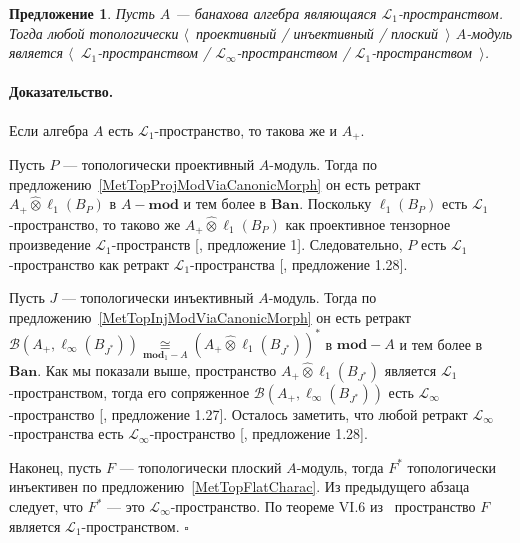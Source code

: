 \documentclass[12pt]{article}
\newcommand{\projtens}{\mathbin{\widehat{\otimes}}}
\newcommand{\isom}[1]{\mathop{\mathbin{\cong}}\limits_{#1}}
\newtheorem{proposition}[theorem]{Предложение}
\renewenvironment{proof}{\paragraph{Доказательство.}}{\hfill$\square$\medskip}
\begin{document}
\begin{proposition}\label{TopProjInjFlatModOverMthscrL1SpCharac} Пусть $A$ ---
    банахова алгебра являющаяся $\mathscr{L}_1$-пространством. Тогда любой
    топологически $\langle$~проективный / инъективный / плоский~$\rangle$
    $A$-модуль является $\langle$~$\mathscr{L}_1$-пространством /
    $\mathscr{L}_\infty$-пространством /
    $\mathscr{L}_1$-пространством~$\rangle$.
\end{proposition}
\begin{proof} Если алгебра $A$ есть $\mathscr{L}_1$-пространство, то такова же и
    $A_+$.

    Пусть $P$ --- топологически проективный $A$-модуль. Тогда по
    предложению~\ref{MetTopProjModViaCanonicMorph} он есть ретракт $A_+\projtens
        \ell_1(B_P)$ в $A-\mathbf{mod}$ и тем более в $\mathbf{Ban}$. Поскольку
    $\ell_1(B_P)$ есть $\mathscr{L}_1$-пространство, то таково же
    $A_+\projtens\ell_1(B_P)$ как проективное тензорное произведение
    $\mathscr{L}_1$-пространств [\cite{GonzDPPInTensProd}, предложение 1].
    Следовательно, $P$ есть $\mathscr{L}_1$-пространство как ретракт
    $\mathscr{L}_1$-пространства [\cite{BourgNewClOfLpSp}, предложение 1.28].

    Пусть $J$ --- топологически инъективный $A$-модуль. Тогда по
    предложению~\ref{MetTopInjModViaCanonicMorph} он есть ретракт
    $\mathcal{B}(A_+,\ell_\infty(B_{J^*})) \isom{\mathbf{mod}_1-A}
        {(A_+\projtens\ell_1(B_{J^*}))}^*$ в $\mathbf{mod}-A$ и тем более в
    $\mathbf{Ban}$. Как мы показали выше, пространство
    $A_+\projtens\ell_1(B_{J^*})$ является $\mathscr{L}_1$-пространством, тогда
    его сопряженное $\mathcal{B}(A_+,\ell_\infty(B_{J^*}))$ есть
    $\mathscr{L}_\infty$-пространство [\cite{BourgNewClOfLpSp}, предложение
    1.27]. Осталось заметить, что любой ретракт
    $\mathscr{L}_\infty$-пространства есть $\mathscr{L}_\infty$-пространство
    [\cite{BourgNewClOfLpSp}, предложение 1.28].

    Наконец, пусть $F$ --- топологически плоский $A$-модуль, тогда $F^*$
    топологически инъективен по предложению~\ref{MetTopFlatCharac}. Из
    предыдущего абзаца следует, что $F^*$ --- это
    $\mathscr{L}_\infty$-пространство. По теореме VI.6
    из~\cite{StegRethNucOpL1LInfSp} пространство $F$ является
    $\mathscr{L}_1$-пространством.
\end{proof}
\end{document}
